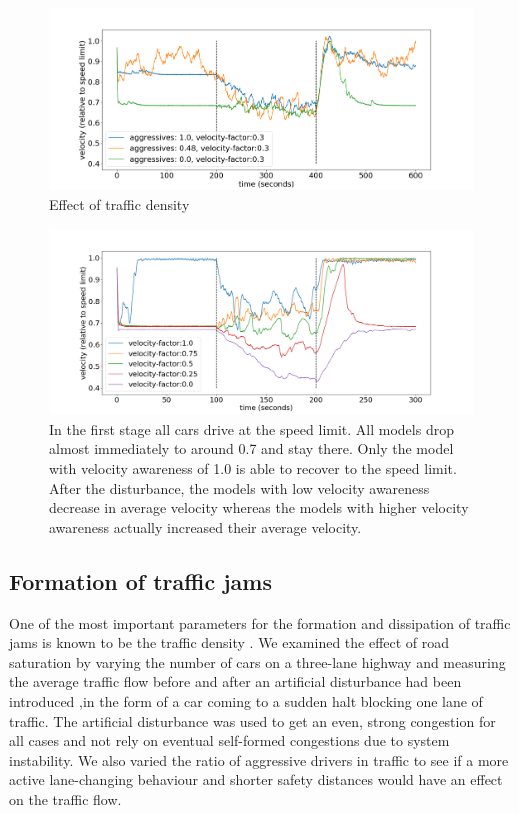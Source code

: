 \documentclass[11pt,a4paper,twocolumn]{article}
\begin{document}
\begin{figure}[t]     
      \centering
       \includegraphics[scale=0.35]{figs/velocity_over_time_aggressive.png}
       \caption{Effect of traffic density }
       \label{fig:vel_agg_over_time}
 \end{figure}
 
\begin{figure}[t]
    \centering
      \includegraphics[scale=0.35, trim={0 0 0 0 }]{figs/velocity_over_time.png}
      \caption{In the first stage all cars drive at the speed limit. All models drop almost immediately to around 0.7 and stay there. Only the model with velocity awareness of 1.0 is able to recover to the speed limit. After the disturbance, the models with low velocity awareness decrease in average velocity whereas the models with higher velocity awareness actually increased their average velocity.}
      \label{fig:vel_over_time}
\end{figure}
 
 \subsection{Formation of traffic jams}
 One of the most important parameters for the formation and dissipation of traffic jams is known to be the traffic density \cite{kerner96trafficjam, kerner97flow}. We examined the effect of road saturation by varying the number of cars on a three-lane highway and measuring the average traffic flow  before and after an artificial disturbance had been introduced ,in the form of a car coming to a sudden halt blocking one lane of traffic. The artificial disturbance was used to get an even, strong congestion for all cases and not rely on eventual self-formed congestions due to system instability.  We also varied the ratio of aggressive drivers in traffic to see if a more active lane-changing behaviour and shorter safety distances would have an effect on the traffic flow.
 
\end{document}
